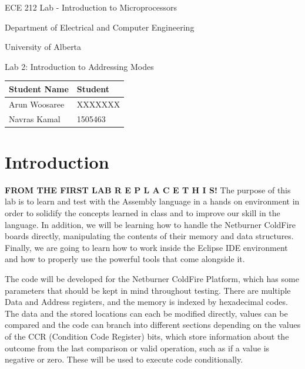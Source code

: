 \documentclass[letterpaper]{article}
\begin{document}
  \begin{titlepage}
    \begin{center}

      \LARGE
      ECE 212 Lab - Introduction to Microprocessors

      Department of Electrical and Computer Engineering

      University of Alberta

      \vspace{2cm}

      Lab 2: Introduction to Addressing Modes

      \vspace{5cm}
      \Large

      \begin{tabular}{ | m{5cm} | m{5cm} | }
        \hline
        Student Name & Student \\
        \hline
        Arun Woosaree & XXXXXXX \\
        \hline
        Navras Kamal & 1505463 \\
        \hline
      \end{tabular}

    \end{center}
\end{titlepage}


\tableofcontents

\newpage

\section{Introduction}
\textbf{FROM THE FIRST LAB  R E P L A C E T H I S!}
  The purpose of this lab is to learn and test with the Assembly language in a
  hands on environment in order to solidify the concepts learned in class and to
  improve our skill in the language.  In addition, we will be learning how to
  handle the Netburner ColdFire boards directly, manipulating the contents of
  their memory and data structures.  Finally, we are going to learn how to work
  inside the Eclipse IDE environment and how to properly use the powerful tools
  that come alongside it.

  The code will be developed for the Netburner ColdFire Platform, which has some
  parameters that should be kept in mind throughout testing.  There are multiple
  Data and Address registers, and the memory is indexed by hexadecimal codes.
  The data and the stored locations can each be modified directly, values can be
  compared and the code can branch into different sections depending on the
  values of the CCR (Condition Code Register) bits, which store information
  about the outcome from the last comparison or valid operation, such as if a
  value is negative or zero.  These will be used to execute code conditionally.
\end{document}
